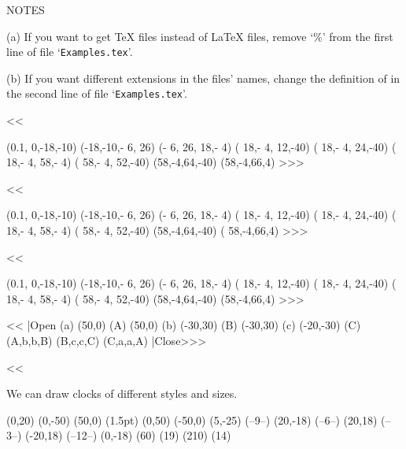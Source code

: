 {\noindent NOTES

(a) If you want to get TeX files instead of LaTeX files, remove `\%'
from the first line of file `{\tt Examples.tex}'.%


(b) If you want different extensions in the files' names, 
change the definition of {\tt\string\ext} in the second line 
of file `{\tt Examples.tex}'.%

\medskip  {}   \def\files{\fileD}


\<<<

\Draw
   \LineAt(0.1,  0,-18,-10)
   \LineAt(-18,-10,- 6, 26)
   \LineAt(- 6, 26, 18,- 4)
   \LineAt( 18,- 4, 12,-40)
   \LineAt( 18,- 4, 24,-40)
   \LineAt( 18,- 4, 58,- 4)
   \LineAt( 58,- 4, 52,-40) 
   \LineAt(58,-4,64,-40) \LineAt(58,-4,66,4)
\EndDraw
\bye >>>


\<<<
  

\Draw
   \LineAt(0.1,  0,-18,-10)
   \LineAt(-18,-10,- 6, 26)
   \LineAt(- 6, 26, 18,- 4)
   \LineAt( 18,- 4, 12,-40)
   \LineAt( 18,- 4, 24,-40)
   \LineAt( 18,- 4, 58,- 4)
   \LineAt( 58,- 4, 52,-40) 
   \LineAt(58,-4,64,-40) \LineAt( 58,-4,66,4)
\EndDraw
>>>


\<<<

\Draw
   \LineAt(0.1,  0,-18,-10)
   \LineAt(-18,-10,- 6, 26)
   \LineAt(- 6, 26, 18,- 4)
   \LineAt( 18,- 4, 12,-40)
   \LineAt( 18,- 4, 24,-40)
   \LineAt( 18,- 4, 58,- 4)
   \LineAt( 58,- 4, 52,-40) 
   \LineAt(58,-4,64,-40) \LineAt(58,-4,66,4)
\EndDraw
>>>




\<<<
|Open 
   \MarkLoc(a)    \Move(50,0)  
   \MarkLoc(A)    \Move(50,0)    
   \MarkLoc(b)    \Move(-30,30) 
   \MarkLoc(B)    \Move(-30,30)
   \MarkLoc(c)    \Move(-20,-30) 
   \MarkLoc(C)    
   \Curve(A,b,b,B) 
   \Curve(B,c,c,C) 
   \Curve(C,a,a,A)
|Close>>>



\<<<
 

We can draw clocks of
different styles and sizes.

\Draw 
  \Move(0,20)     \Line(0,-50) \Line(50,0)
  \PenSize(1.5pt) \Line(0,50)  \Line(-50,0)
  \Move(5,-25)    \Text(--9--)
  \Move(20,-18)   \Text(--6--)
  \Move(20,18)    \Text(--3--)
  \Move(-20,18)   \Text(--12--)
  \Move(0,-18)    {\RotateTo(60) \LineF(19)}
  \RotateTo(210)  \LineF(14)
\EndDraw

}
